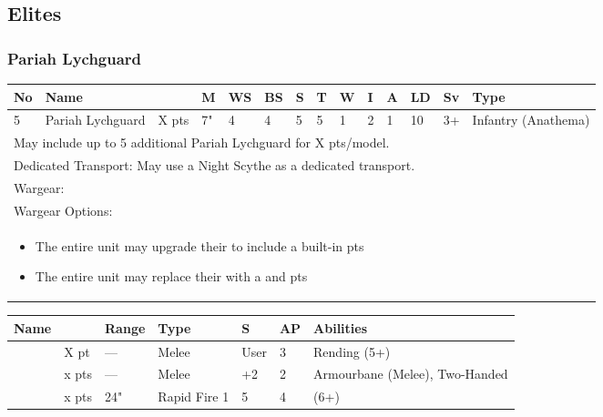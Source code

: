 \subsection{Elites}

\subsubsection{Pariah Lychguard}

\noindent
\begin{tabular}{||m{10pt} m{95pt} m{30pt} m{11pt} m{11pt} m{11pt} m{11pt} m{11pt} m{11pt} m{11pt} m{11pt} m{11pt} m{11pt} m{125pt}||}
	\hline
	No & Name & & M & WS & BS & S & T & W & I & A & LD & Sv & Type \\
	\hline
	5 & Pariah Lychguard & X pts & 7" & 4 & 4 & 5 & 5 & 1 & 2 & 1 & 10 & 3+ & Infantry (Anathema)\\
	\hline
	\hline
	\multicolumn{14}{||Z{532 pt}||}{May include up to 5 additional Pariah Lychguard for X pts/model.}\\	
	\multicolumn{14}{||Z{532 pt}||}{Dedicated Transport: May use a Night Scythe as a dedicated transport.}\\
	\hline
	\hline
	\multicolumn{14}{||Z{532 pt}||}{Wargear: \quickref{Warscythe}}\\
	\multicolumn{14}{||Z{532 pt}||}{Wargear Options:} \\
	\multicolumn{14}{||Z{532 pt}||}{\begin{itemize}
			\item The entire unit may upgrade their \quickref{Warscythe} to include a built-in \quickref{Gauss Blaster} \hrulefill 5 pts
			\item The entire unit may replace their \quickref{Warscythe} with a \quickref{Hyperphase Sword} and \quickref{Dispersion Shield} \hrulefill 10 pts
		\end{itemize}} \\
	\hline
\end{tabular}

\noindent
\begin{tabular}{||m{110pt} m{30pt} m{31pt} m{55pt} m{12pt} m{12pt} m{210pt}||}
	\hline
	Name & & Range & Type & S & AP & Abilities \\
	\hline
	\quickref{Hyperphase Sword} & X pt & — & Melee & User & 3 & Rending (5+) \\
	\quickref{Warscythe} & x pts& — & Melee & +2 & 2 & Armourbane (Melee), Two-Handed \\
	\quickref{Gauss Blaster} & x pts& 24" & Rapid Fire 1 & 5 & 4 & \quickref{Gauss} (6+) \\
	\hline
\end{tabular}

